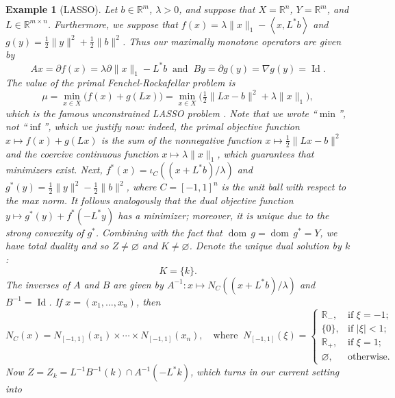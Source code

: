 \documentclass{article}
\newcommand{\thalb}{\ensuremath{\tfrac{1}{2}}}
\newcommand{\scal}[2]{\left\langle{#1},{#2}  \right\rangle}
\newcommand{\RR}{\ensuremath{\mathbb R}}
\newcommand{\RP}{\ensuremath{\mathbb{R}_+}}
\newcommand{\RM}{\ensuremath{\mathbb{R}_-}}
\newcommand{\dom}{\ensuremath{\operatorname{dom}}\,}
\newcommand{\Id}{\ensuremath{\operatorname{Id}}}
\newtheorem{example}[theorem]{Example}
\begin{document}
\begin{example}[LASSO]
Let $b\in\RR^m$, $\lambda>0$, and 
suppose that $X=\RR^n$, $Y=\RR^m$, and 
$L\in \RR^{m\times n}$.
Furthermore, 
we suppose that $f(x) = \lambda\|x\|_1 -\scal{x}{L^*b}$ 
and $g(y) = \thalb\|y\|^2 + \thalb\|b\|^2$.
Thus our maximally monotone operators are given by 
\begin{equation}
Ax = \partial f(x) = \lambda\partial \|x\|_1 - L^*b
\;\;\text{and}\;\;
By = \partial g(y)= \nabla g(y) = \Id.
\end{equation}
The value of the primal Fenchel-Rockafellar problem is 
\begin{equation}
\mu = \min_{x\in X} \big(f(x)+g(Lx)\big) = 
\min_{x\in X} \big(\thalb\|Lx-b\|^2 + \lambda\|x\|_1\big),
\end{equation}
which is the famous unconstrained LASSO problem \cite{Tib}. 
Note that we wrote ``$\min$'', not ``$\inf$'', which we justify now: 
indeed, 
the primal objective function $x\mapsto f(x)+g(Lx)$ is the sum of the 
nonnegative function $x\mapsto \thalb\|Lx-b\|^2$ and 
the coercive continuous function $x\mapsto\lambda\|x\|_1$, which 
guarantees that minimizers exist. 
Next, $f^*(x) = \iota_C((x+L^*b)/\lambda)$ and 
$g^*(y) = \thalb\|y\|^2-\thalb\|b\|^2$, where 
$C=[-1,1]^n$ is the unit ball with respect to the max norm. 
It follows analogously that the dual objective function 
$y\mapsto g^*(y)+f^*(-L^*y)$ has a minimizer; moreover, it is 
unique due to the strong convexity of $g^*$. Combining 
with the fact that $\dom g = \dom g^* = Y$, we have total duality and 
so $Z\neq\varnothing$ and $K\neq\varnothing$. 
Denote the unique dual solution by $k$:
\begin{equation}
K = \{k\}. 
\end{equation}
The inverses of $A$ and $B$ are given by $A^{-1}\colon x \mapsto  N_C((x+L^*b)/\lambda)$ and $B^{-1} = \Id$. 
If $x=(x_1,\ldots,x_n)$, then 
\begin{equation}
N_C(x) = N_{[-1,1]}(x_1)\times \cdots\times N_{[-1,1]}(x_n), 
\quad\text{where}\;\;
N_{[-1,1]}(\xi) = \begin{cases}
\RM, &\text{if $\xi=-1$;}\\
\{0\}, &\text{if $|\xi|<1$;}\\
\RP, &\text{if $\xi=1$;}\\
\varnothing, &\text{otherwise.}
\end{cases}
\end{equation}
Now 
$Z=Z_k = L^{-1}B^{-1}(k) \cap A^{-1}(-L^*k)$, 
which turns in our current setting into 
\begin{equation}

\end{equation}
\end{example}
\end{document}
